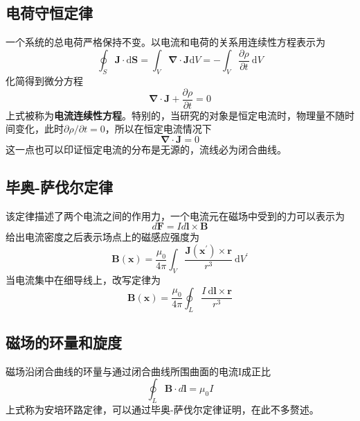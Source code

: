 		\subsection{电荷守恒定律}
			一个系统的总电荷严格保持不变。以电流和电荷的关系用连续性方程表示为
				\begin{equation}
					\oint_{S} \boldsymbol{J} \cdot \mathrm{d} \boldsymbol{S}=\int_V \boldsymbol{\nabla} \cdot \boldsymbol{J} \mathrm{d} V=-\int_{V} \frac{\partial \rho}{\partial t} \mathrm{~d} V
				\end{equation}
			化简得到微分方程
			\begin{equation}
				\boldsymbol{\nabla} \cdot \boldsymbol{J}+\frac{\partial \rho}{\partial t}=0
			\end{equation}
			上式被称为\textbf{电流连续性方程}。特别的，当研究的对象是恒定电流时，物理量不随时间变化，此时$\partial \rho/\partial t=0$，所以在恒定电流情况下
			\begin{equation}
			\boldsymbol{\nabla} \cdot \boldsymbol{J}=0
			\end{equation}
			这一点也可以印证恒定电流的分布是无源的，流线必为闭合曲线。
		\subsection{毕奥-萨伐尔定律}
			该定律描述了两个电流之间的作用力，一个电流元在磁场中受到的力可以表示为
			\begin{equation}
			d \boldsymbol{F}=Id \boldsymbol{l}\times \boldsymbol{B}
			\end{equation}
			给出电流密度之后表示场点上的磁感应强度为
			\begin{equation}
				\boldsymbol{B}(\boldsymbol{x})=\frac{\mu_{0}}{4 \pi} \int_{V} \frac{\boldsymbol{J}\left(\boldsymbol{x}^{\prime}\right) \times \boldsymbol{r}}{r^{3}} \mathrm{~d} V^{\prime}
			\end{equation}
			当电流集中在细导线上，改写定律为
			\begin{equation}
				\boldsymbol{B}(\boldsymbol{x})=\frac{\mu_{0}}{4 \pi} \oint_{L} \frac{I \mathrm{~d} \boldsymbol{l} \times \boldsymbol{r}}{r^{3}}
			\end{equation}
	\subsection{磁场的环量和旋度}
		磁场沿闭合曲线的环量与通过闭合曲线所围曲面的电流I成正比
		\begin{equation}
		\oint_L \boldsymbol{B} \cdot d \boldsymbol{l}=\mu_0 I
		\label{fig.安培环路定律}
		\end{equation}
		上式称为安培环路定律，可以通过毕奥-萨伐尔定律证明，在此不多赘述。

